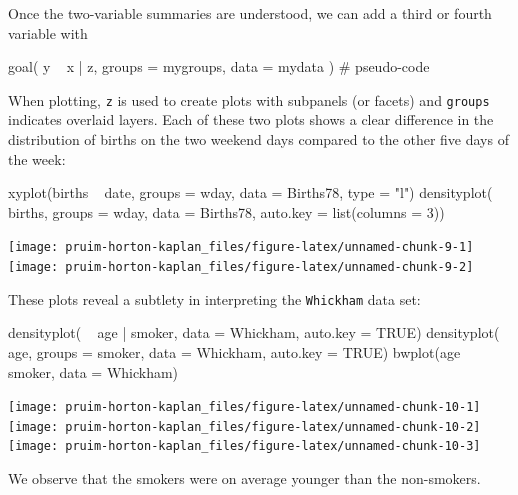 Once the two-variable summaries are understood, we can add a third or
fourth variable with

\begin{Schunk}
\begin{Sinput}
goal( y ~ x | z, groups = mygroups, data = mydata )    # pseudo-code
\end{Sinput}
\end{Schunk}

\noindent
When plotting, \texttt{z} is used to create plots with subpanels (or
facets) and \texttt{groups} indicates overlaid layers. Each of these two
plots shows a clear difference in the distribution of births on the two
weekend days compared to the other five days of the week:

\begin{Schunk}
\begin{Sinput}
xyplot(births ~ date, groups = wday, data = Births78, type = "l")
densityplot( ~ births, groups = wday, data = Births78, auto.key = list(columns = 3))
\end{Sinput}


\begin{center}\texttt{[image: pruim-horton-kaplan\_files/figure-latex/unnamed-chunk-9-1]} \texttt{[image: pruim-horton-kaplan\_files/figure-latex/unnamed-chunk-9-2]} \end{center}

\end{Schunk}

These plots reveal a subtlety in interpreting the \texttt{Whickham} data
set:

\begin{Schunk}
\begin{Sinput}
densityplot( ~ age | smoker, data = Whickham, auto.key = TRUE)
densityplot( ~ age, groups = smoker, data = Whickham, auto.key = TRUE)
bwplot(age ~ smoker, data = Whickham)
\end{Sinput}


\begin{center}\texttt{[image: pruim-horton-kaplan\_files/figure-latex/unnamed-chunk-10-1]} \texttt{[image: pruim-horton-kaplan\_files/figure-latex/unnamed-chunk-10-2]} \texttt{[image: pruim-horton-kaplan\_files/figure-latex/unnamed-chunk-10-3]} \end{center}

\end{Schunk}

\noindent
We observe that the smokers were on average younger than the
non-smokers.

